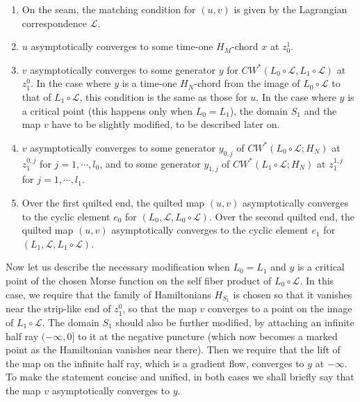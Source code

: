 \documentclass{amsart}
\numberwithin{equation}{section}
\numberwithin{figure}{section}
\begin{document}
\begin{enumerate}[label=(\roman*)]
\item On the seam, the matching condition for $(u, v)$ is given by the Lagrangian correspondence $\mathcal{L}$.

\item $u$ asymptotically converges to some time-one $H_{M}$-chord $x$ at $z_{0}^{1}$.

\item $v$ asymptotically converges to some generator $y$ for $CW^{*}(L_{0} \circ \mathcal{L}, L_{1} \circ \mathcal{L})$ at $z_{1}^{0}$. In the case where $y$ is a time-one $H_{N}$-chord from the image of $L_{0} \circ \mathcal{L}$ to that of $L_{1} \circ \mathcal{L}$, this condition is the same as those for $u$. In the case where $y$ is a critical point (this happens only when $L_{0} = L_{1}$), the domain $S_{1}$ and the map $v$ have to be slightly modified, to be described later on.

\item $v$ asymptotically converges to some generator $y_{0, j}$ of $CW^{*}(L_{0} \circ \mathcal{L}; H_{N})$ at $z_{1}^{0, j}$ for $j = 1, \cdots, l_{0}$, and to some generator $y_{1, j}$ of $CW^{*}(L_{1} \circ \mathcal{L}; H_{N})$ at $z_{1}^{1, j}$ for $j = 1, \cdots, l_{1}$.

\item Over the first quilted end, the quilted map $(u, v)$ asymptotically converges to the cyclic element $e_{0}$ for $(L_{0}, \mathcal{L}, L_{0} \circ \mathcal{L})$. Over the second quilted end, the quilted map $(u, v)$ asymptotically converges to the cyclic element $e_{1}$ for $(L_{1}, \mathcal{L}, L_{1} \circ \mathcal{L})$.

\end{enumerate}
Now let us describe the necessary modification when $L_{0} = L_{1}$ and $y$ is a critical point of the chosen Morse function on the self fiber product of $L_{0} \circ \mathcal{L}$. In this case, we require that the family of Hamiltonians $H_{S_{1}}$ is chosen so that it vanishes near the strip-like end of $z_{1}^{0}$, so that the map $v$ converges to a point on the image of $L_{1} \circ \mathcal{L}$. The domain $S_{1}$ should also be further modified, by attaching an infinite half ray $(-\infty, 0]$ to it at the negative puncture (which now becomes a marked point as the Hamiltonian vanishes near there). Then we require that the lift of the map on the infinite half ray, which is a gradient flow, converges to $y$ at $-\infty$. To make the statement concise and unified, in both cases we shall briefly say that the map $v$ asymptotically converges to $y$. \par
\end{document}
